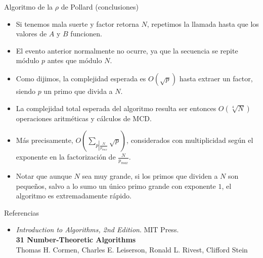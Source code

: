 \documentclass{beamer}
\begin{document}
\begin{frame}{Algoritmo de la $\rho$ de Pollard (conclusiones)}

    \begin{itemize}
      \item Si tenemos mala suerte y factor retorna $N$, repetimos la llamada hasta que los valores de $A$ y $B$ funcionen.
      \item El evento anterior normalmente no ocurre, ya que la secuencia se repite módulo $p$ antes que módulo $N$.
      \item Como dijimos, la complejidad esperada es $O(\sqrt{p})$ hasta extraer un factor, siendo $p$ un primo que divida a $N$.
      \item La complejidad total esperada del algoritmo resulta ser entonces $O \left (\sqrt[4]{N} \right )$ operaciones aritméticas y cálculos de MCD.
      \item Más precisamente, $O \left (\sum_{p \left |\frac{N}{p_{max}} \right .}{\sqrt p} \right )$, considerados con multiplicidad según el exponente en la factorización de $\frac{N}{p_{max}}$.
      \item Notar que aunque $N$ sea muy grande, si los primos que dividen a $N$ son pequeños, salvo a lo sumo un único primo grande con exponente $1$, el algoritmo es extremadamente rápido.
    \end{itemize}
\end{frame}

\begin{frame}{Referencias}

    \begin{itemize}
      \item \textit{Introduction to Algorithms, 2nd Edition}. MIT Press. \\ \textbf{31 Number-Theoretic Algorithms}  \\ Thomas H. Cormen, Charles E. Leiserson, Ronald L. Rivest, Clifford Stein
    \end{itemize}
\end{frame}
\end{document}
